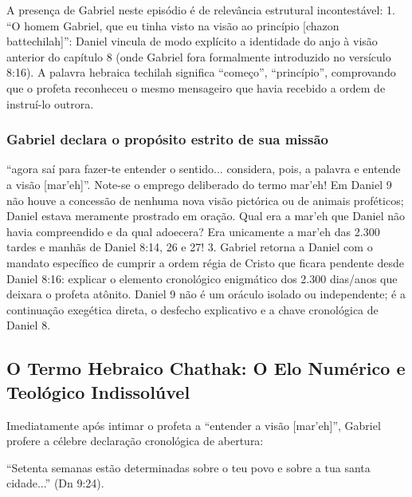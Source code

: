 A presença de Gabriel neste episódio é de relevância estrutural incontestável:
1. ``O homem Gabriel, que eu tinha visto na visão ao princípio [chazon battechilah]'': Daniel vincula de modo explícito a identidade do anjo à visão anterior do capítulo 8 (onde Gabriel fora formalmente introduzido no versículo 8:16). A palavra hebraica techilah significa ``começo'', ``princípio'', comprovando que o profeta reconheceu o mesmo mensageiro que havia recebido a ordem de instruí-lo outrora.

\subsubsection*{Gabriel declara o propósito estrito de sua missão}
``agora saí para fazer-te entender o sentido... considera, pois, a palavra e entende a visão [mar'eh]''. Note-se o emprego deliberado do termo mar'eh! Em Daniel 9 não houve a concessão de nenhuma nova visão pictórica ou de animais proféticos; Daniel estava meramente prostrado em oração. Qual era a mar'eh que Daniel não havia compreendido e da qual adoecera? Era unicamente a mar'eh das 2.300 tardes e manhãs de Daniel 8:14, 26 e 27!
3. Gabriel retorna a Daniel com o mandato específico de cumprir a ordem régia de Cristo que ficara pendente desde Daniel 8:16: explicar o elemento cronológico enigmático dos 2.300 dias/anos que deixara o profeta atônito. Daniel 9 não é um oráculo isolado ou independente; é a continuação exegética direta, o desfecho explicativo e a chave cronológica de Daniel 8.



\subsection{O Termo Hebraico Chathak: O Elo Numérico e Teológico Indissolúvel}


Imediatamente após intimar o profeta a ``entender a visão [mar'eh]'', Gabriel profere a célebre declaração cronológica de abertura:

``Setenta semanas estão determinadas sobre o teu povo e sobre a tua santa cidade...'' (Dn 9:24).

